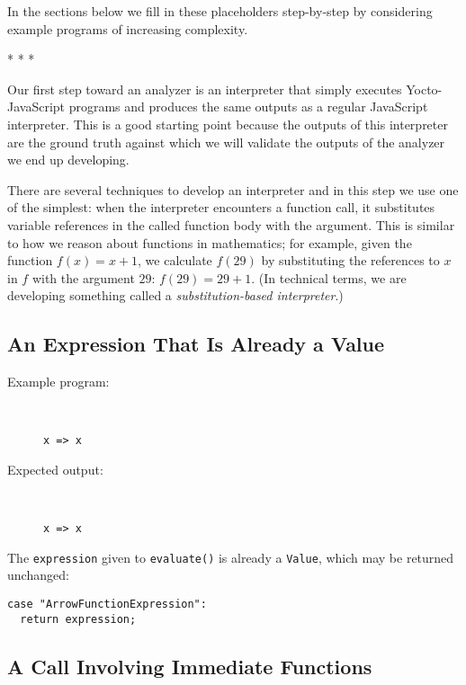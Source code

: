 \documentclass[12pt, oneside]{book}
\begin{document}
In the sections below we fill in these placeholders step-by-step by considering example programs of increasing complexity.

* * *

Our first step toward an analyzer is an interpreter that simply executes Yocto-JavaScript programs and produces the same outputs as a regular JavaScript interpreter. This is a good starting point because the outputs of this interpreter are the ground truth against which we will validate the outputs of the analyzer we end up developing.

There are several techniques to develop an interpreter and in this step we use one of the simplest: when the interpreter encounters a function call, it substitutes variable references in the called function body with the argument. This is similar to how we reason about functions in mathematics; for example, given the function $f(x) = x + 1$, we calculate $f(29)$ by substituting the references to $x$ in $f$ with the argument $29$: $f(29) = 29 + 1$. (In technical terms, we are developing something called a \emph{substitution-based interpreter}.)

\subsection{An Expression That Is Already a Value}

\begin{description}
\item [Example program:] ~

\begin{verbatim}
x => x
\end{verbatim}

\item [Expected output:] ~

\begin{verbatim}
x => x
\end{verbatim}
\end{description}

The \texttt{expression} given to \texttt{evaluate()} is already a \texttt{Value}, which may be returned unchanged:

\begin{verbatim}
case "ArrowFunctionExpression":
  return expression;
\end{verbatim}

\subsection{A Call Involving Immediate Functions}
\end{document}
